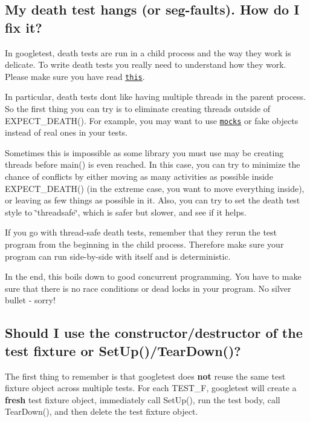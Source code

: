 \subsection*{My death test hangs (or seg-\/faults). How do I fix it?}

In googletest, death tests are run in a child process and the way they work is delicate. To write death tests you really need to understand how they work. Please make sure you have read \href{advanced.md#how-it-works}{\tt this}.

In particular, death tests don\textquotesingle{}t like having multiple threads in the parent process. So the first thing you can try is to eliminate creating threads outside of {\ttfamily E\+X\+P\+E\+C\+T\+\_\+\+D\+E\+A\+T\+H()}. For example, you may want to use \href{../../googlemock}{\tt mocks} or fake objects instead of real ones in your tests.

Sometimes this is impossible as some library you must use may be creating threads before {\ttfamily main()} is even reached. In this case, you can try to minimize the chance of conflicts by either moving as many activities as possible inside {\ttfamily E\+X\+P\+E\+C\+T\+\_\+\+D\+E\+A\+T\+H()} (in the extreme case, you want to move everything inside), or leaving as few things as possible in it. Also, you can try to set the death test style to {\ttfamily \char`\"{}threadsafe\char`\"{}}, which is safer but slower, and see if it helps.

If you go with thread-\/safe death tests, remember that they rerun the test program from the beginning in the child process. Therefore make sure your program can run side-\/by-\/side with itself and is deterministic.

In the end, this boils down to good concurrent programming. You have to make sure that there is no race conditions or dead locks in your program. No silver bullet -\/ sorry!

\subsection*{Should I use the constructor/destructor of the test fixture or Set\+Up()/\+Tear\+Down()?}

The first thing to remember is that googletest does {\bfseries not} reuse the same test fixture object across multiple tests. For each {\ttfamily T\+E\+S\+T\+\_\+F}, googletest will create a {\bfseries fresh} test fixture object, immediately call {\ttfamily Set\+Up()}, run the test body, call {\ttfamily Tear\+Down()}, and then delete the test fixture object.

